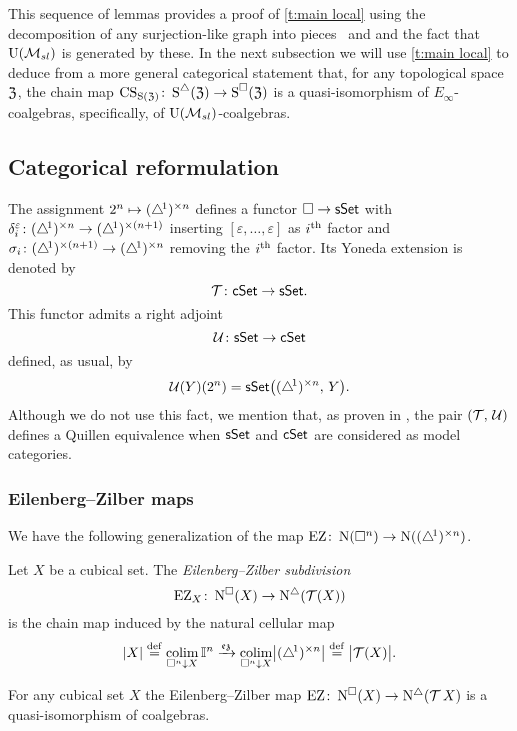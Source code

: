 This sequence of lemmas provides a proof of \cref{t:main local} using the decomposition of any surjection-like graph into pieces \coproduct \ and \product and the fact that $\USL$ is generated by these.
In the next subsection we will use \cref{t:main local} to deduce from a more general categorical statement that, for any topological space $\fZ$, the chain map $\CS_{\Schains(\fZ)} \colon \sSchains(\fZ) \to \cSchains(\fZ)$ is a quasi-isomorphism of $E_\infty$-coalgebras, specifically, of $\USL$-coalgebras.

\subsection{Categorical reformulation}

The assignment $2^n \mapsto \scube{n}$ defines a functor $\cube \to \sSet$ with $\delta_i^\varepsilon \colon \scube{n} \to \scube{(n+1)}$ inserting $[\varepsilon, \dots, \varepsilon]$ as $i^\th$ factor and $\sigma_i \colon \scube{(n+1)} \to \scube{n}$ removing the $i^\th$ factor.
Its Yoneda extension is denoted by
\[
\triangulate \colon \cSet \to \sSet.
\]
This functor admits a right adjoint
\[
\cubify \colon \sSet \to \cSet
\]
defined, as usual, by
\[
\cubify(Y)(2^n) = \sSet \big( \scube{n}, \, Y \big).
\]
Although we do not use this fact, we mention that, as proven in \cite[\S 8.4.30]{cisinski2006presheaves}, the pair $(\triangulate,\, \cubify)$ defines a Quillen equivalence when $\sSet$ and $\cSet$ are considered as model categories.

\subsubsection{Eilenberg--Zilber maps}

We have the following generalization of the map $\EZ \colon \chains(\cube^n) \to \chains(\scube{n})$.

\begin{definition}
	Let $X$ be a cubical set.
	The \textit{Eilenberg--Zilber subdivision}
	\[
	\EZ_X \colon \cchains(X) \to \schains(\triangulate(X))
	\]
	is the chain map induced by the natural cellular map
	\[
	\bars{X} \defeq
	\colim_{\cube^n \downarrow X} \gcube^n \xra{\ez}
	\colim_{\cube^n \downarrow X} \bars[\big]{\scube{n}} \defeq
	\bars[\big]{\triangulate(X)}.
	\]
\end{definition}

\begin{proposition}
	For any cubical set $X$ the Eilenberg--Zilber map $\EZ \colon \cchains(X) \to \schains(\triangulate X)$ is a quasi-isomorphism of coalgebras.
\end{proposition}


